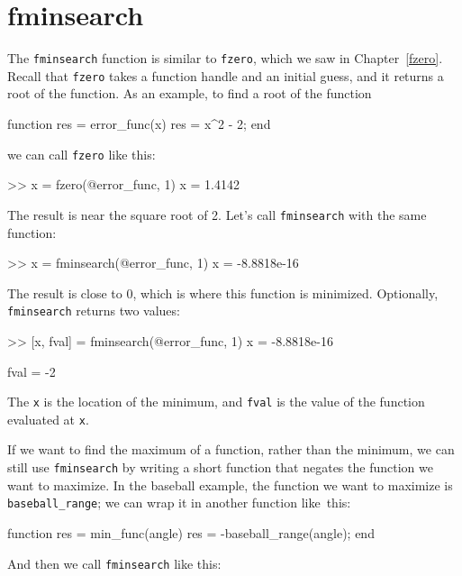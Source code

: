 \section{fminsearch}

The \lstinline{fminsearch} function is similar to \lstinline{fzero}, which we saw in Chapter~\ref{fzero}.  Recall that \lstinline{fzero} takes a function handle and an initial guess, and it returns a root of the function.
As an example, to find a root of the function


\begin{code}
function res = error_func(x)
    res = x^2 - 2;
end
\end{code}
we can call \lstinline{fzero} like this:

\begin{code}
>> x = fzero(@error_func, 1)
x = 1.4142
\end{code}

The result is near the square root of 2.  Let's call \lstinline{fminsearch} with the same function:

\begin{code}
>> x = fminsearch(@error_func, 1)
x = -8.8818e-16
\end{code}

The result is close to 0, which is where this function is minimized.  Optionally, \lstinline{fminsearch} returns two values:

\begin{code}
>> [x, fval] = fminsearch(@error_func, 1)
x = -8.8818e-16

fval = -2
\end{code}

The \lstinline{x} is the location of the minimum, and \lstinline{fval} is the value of the function evaluated at \lstinline{x}.

If we want to find the maximum of a function, rather than the minimum, we can still use \lstinline{fminsearch} by writing a short function that negates the function we want to maximize.
In the baseball example, the function we want to maximize is \lstinline{baseball_range}; we can wrap it in another function like~this:

\begin{code}
function res = min_func(angle)
    res = -baseball_range(angle);
end
\end{code}

And then we call \lstinline{fminsearch} like this:

